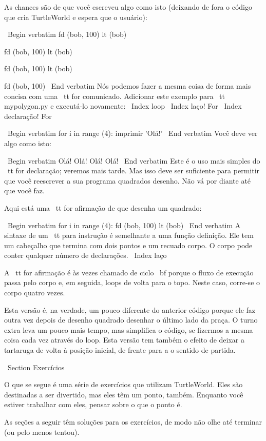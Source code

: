 \documentclass[10pt]{book}
\begin{document}
{As chances são de que você escreveu algo como isto (deixando de fora o código
que cria TurtleWorld e espera que o usuário):

\ Begin {verbatim}
fd (bob, 100)
lt (bob)

fd (bob, 100)
lt (bob)

fd (bob, 100)
lt (bob)

fd (bob, 100)
\ End {verbatim}
%
Nós podemos fazer a mesma coisa de forma mais concisa com uma {\ tt for} comunicado.
Adicionar este exemplo para {\ tt mypolygon.py} e executá-lo novamente:
\ Index {loop}
\ Index {laço! For}
\ Index {declaração! For}

\ Begin {verbatim}
for i in range (4):
    imprimir 'Olá!'
\ End {verbatim}
%
Você deve ver algo como isto:

\ Begin {verbatim}
Olá!
Olá!
Olá!
Olá!
\ End {verbatim}
%
Este é o uso mais simples do {\ tt for} declaração; veremos
mais tarde. Mas isso deve ser suficiente para permitir que você reescrever a sua
programa quadrados desenho. Não vá por diante até que você faz.

Aqui está uma {\ tt for} afirmação de que desenha um quadrado:

\ Begin {verbatim}
for i in range (4):
    fd (bob, 100)
    lt (bob)
\ End {verbatim}
%
A sintaxe de um {\ tt} para instrução é semelhante a uma função
definição. Ele tem um cabeçalho que termina com dois pontos e um recuado
corpo. O corpo pode conter qualquer número de declarações.
\ Index {laço}

A {\ tt for} afirmação é às vezes chamado de ciclo {\ bf} porque
o fluxo de execução passa pelo corpo e, em seguida, loops de volta
para o topo. Neste caso, corre-se o corpo quatro vezes.

Esta versão é, na verdade, um pouco diferente do anterior
código porque ele faz outra vez depois de desenho quadrado
desenhar o último lado da praça. O turno extra leva um pouco
mais tempo, mas simplifica o código, se fizermos a mesma coisa
cada vez através do loop. Esta versão tem também o efeito
de deixar a tartaruga de volta à posição inicial, de frente para a
o sentido de partida.

\ Section {Exercícios}

O que se segue é uma série de exercícios que utilizam TurtleWorld. Eles
são destinadas a ser divertido, mas eles têm um ponto, também. Enquanto você estiver
trabalhar com eles, pensar sobre o que o ponto é.

As seções a seguir têm soluções para os exercícios, de modo
não olhe até terminar (ou pelo menos tentou).

}
\end{document}
